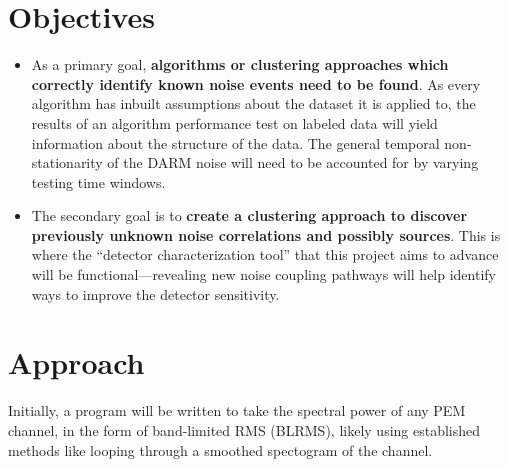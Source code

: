 \documentclass[colorlinks=true,pdfstartview=FitV,linkcolor=blue,
            citecolor=red,urlcolor=magenta]{ligodoc}
\begin{document}
\section{Objectives}
\begin{itemize}
\item
As a primary goal, \textbf{algorithms or clustering approaches which correctly identify known noise events need to be found}.
As every algorithm has inbuilt assumptions about the dataset it is applied to, the results of an algorithm performance test on labeled data will yield information about the structure of the data.
The general temporal non-stationarity of the DARM noise will need to be accounted for by varying testing time windows.
\item
The secondary goal is to \textbf{create a clustering approach to discover previously unknown noise correlations and possibly sources}.
This is where the ``detector characterization tool'' that this project aims to advance will be functional---revealing new noise coupling pathways will help identify ways to improve the detector sensitivity.
\end{itemize}

\section{Approach}

Initially, a program will be written to take the spectral power of any PEM channel, in the form of band-limited RMS (BLRMS), likely using established methods like looping through a smoothed spectogram of the channel\cite{vajente}.
\end{document}
